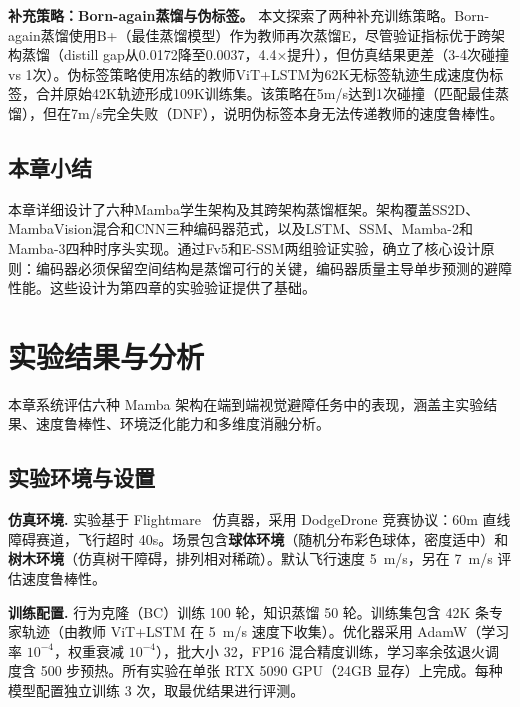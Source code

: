 \documentclass[12pt,a4paper]{article}
\makeatletter
\numberwithin{equation}{section}
\numberwithin{figure}{section}
\numberwithin{table}{section}
\newcommand{\cleardoublepage}{\clearpage\if@twoside\ifodd\c@page\else\hbox{}\thispagestyle{empty}\newpage\if@twocolumn\hbox{}\newpage\fi\fi\fi}%
\makeatother
\begin{document}
\textbf{补充策略：Born-again蒸馏与伪标签。} 本文探索了两种补充训练策略。Born-again蒸馏使用B+（最佳蒸馏模型）作为教师再次蒸馏E，尽管验证指标优于跨架构蒸馏（distill gap从0.0172降至0.0037，4.4$\times$提升），但仿真结果更差（3-4次碰撞 vs 1次）。伪标签策略使用冻结的教师ViT+LSTM为62K无标签轨迹生成速度伪标签，合并原始42K轨迹形成109K训练集。该策略在5m/s达到1次碰撞（匹配最佳蒸馏），但在7m/s完全失败（DNF），说明伪标签本身无法传递教师的速度鲁棒性。

\subsection{本章小结}

本章详细设计了六种Mamba学生架构及其跨架构蒸馏框架。架构覆盖SS2D、MambaVision混合和CNN三种编码器范式，以及LSTM、SSM、Mamba-2和Mamba-3四种时序头实现。通过Fv5和E-SSM两组验证实验，确立了核心设计原则：编码器必须保留空间结构是蒸馏可行的关键，编码器质量主导单步预测的避障性能。这些设计为第四章的实验验证提供了基础。

\cleardoublepage
\section{实验结果与分析}
\label{chap:experiment}

本章系统评估六种 Mamba 架构在端到端视觉避障任务中的表现，涵盖主实验结果、速度鲁棒性、环境泛化能力和多维度消融分析。

\subsection{实验环境与设置}
\label{sec:exp-setup}

\textbf{仿真环境.} 实验基于 Flightmare~\cite{shah2017flightmare} 仿真器，采用 DodgeDrone 竞赛协议：60m 直线障碍赛道，飞行超时 40s。场景包含\textbf{球体环境}（随机分布彩色球体，密度适中）和\textbf{树木环境}（仿真树干障碍，排列相对稀疏）。默认飞行速度 5~m/s，另在 7~m/s 评估速度鲁棒性。

\textbf{训练配置.} 行为克隆（BC）训练 100 轮，知识蒸馏 50 轮。训练集包含 42K 条专家轨迹（由教师 ViT+LSTM 在 5~m/s 速度下收集）。优化器采用 AdamW（学习率 $10^{-4}$，权重衰减 $10^{-4}$），批大小 32，FP16 混合精度训练，学习率余弦退火调度含 500 步预热。所有实验在单张 RTX 5090 GPU（24GB 显存）上完成。每种模型配置独立训练 3 次，取最优结果进行评测。
\end{document}
